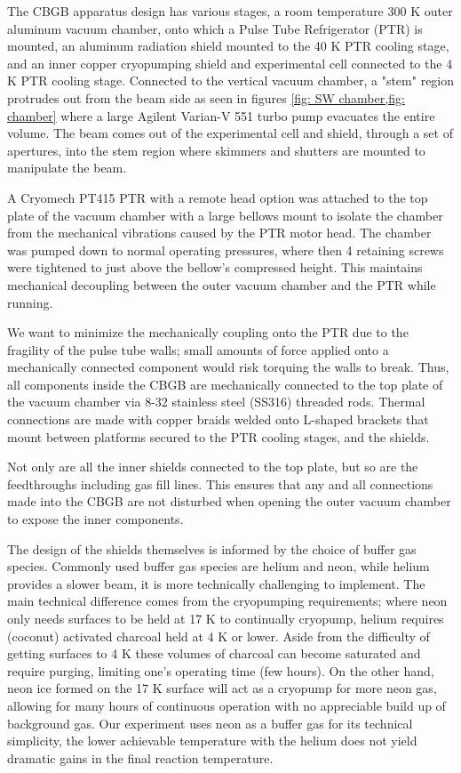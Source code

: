 The CBGB apparatus design has various stages, a room temperature 300 K outer aluminum vacuum chamber, onto which a Pulse Tube Refrigerator (PTR) is mounted, an aluminum radiation shield mounted to the 40 K PTR cooling stage, and an inner copper cryopumping shield and experimental cell connected to the 4 K PTR cooling stage. Connected to the vertical vacuum chamber, a "stem" region protrudes out from the beam side as seen in figures \cref{fig: SW chamber,fig: chamber} where a large Agilent Varian-V 551 turbo pump evacuates the entire volume. The beam comes out of the experimental cell and shield, through a set of apertures, into the stem region where skimmers and shutters are mounted to manipulate the beam.

A Cryomech PT415 PTR with a remote head option was attached to the top plate of the vacuum chamber with a large bellows mount to isolate the chamber from the mechanical vibrations caused by the PTR motor head. The chamber was pumped down to normal operating pressures, where then 4 retaining screws were tightened to just above the bellow's compressed height. This maintains mechanical decoupling between the outer vacuum chamber and the PTR while running.

We want to minimize the mechanically coupling onto the PTR due to the fragility of the pulse tube walls; small amounts of force applied onto a mechanically connected component would risk torquing the walls to break. Thus, all components inside the CBGB are mechanically connected to the top plate of the vacuum chamber via 8-32 stainless steel (SS316) threaded rods. Thermal connections are made with copper braids welded onto L-shaped brackets that mount between platforms secured to the PTR cooling stages, and the shields.

Not only are all the inner shields connected to the top plate, but so are the feedthroughs including gas fill lines. This ensures that any and all connections made into the CBGB are not disturbed when opening the outer vacuum chamber to expose the inner components.

The design of the shields themselves is informed by the choice of buffer gas species. Commonly used buffer gas species are helium and neon, while helium provides a slower beam, it is more technically challenging to implement. The main technical difference comes from the cryopumping requirements; where neon only needs surfaces to be held at 17 K to continually cryopump, helium requires (coconut) activated charcoal held at 4 K or lower. Aside from the difficulty of getting surfaces to 4 K these volumes of charcoal can become saturated and require purging, limiting one's operating time (few hours). On the other hand, neon ice formed on the 17 K surface will act as a cryopump for more neon gas, allowing for many hours of continuous operation with no appreciable build up of background gas. Our experiment uses neon as a buffer gas for its technical simplicity, the lower achievable temperature with the helium does not yield dramatic gains in the final reaction temperature.

